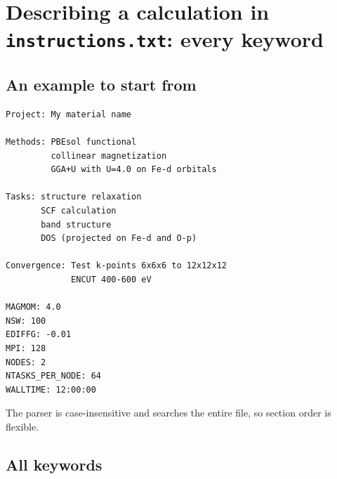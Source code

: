 \documentclass[11pt,a4paper]{scrartcl}
\begin{document}
\section{Describing a calculation in \texttt{instructions.txt}: every keyword}
\label{sec:instructions}

\subsection{An example to start from}

\begin{lstlisting}
Project: My material name

Methods: PBEsol functional
         collinear magnetization
         GGA+U with U=4.0 on Fe-d orbitals

Tasks: structure relaxation
       SCF calculation
       band structure
       DOS (projected on Fe-d and O-p)

Convergence: Test k-points 6x6x6 to 12x12x12
             ENCUT 400-600 eV

MAGMOM: 4.0
NSW: 100
EDIFFG: -0.01
MPI: 128
NODES: 2
NTASKS_PER_NODE: 64
WALLTIME: 12:00:00
\end{lstlisting}

The parser is case-insensitive and searches the entire file, so section
order is flexible.

\subsection{All keywords}
\label{sec:keywords}
\end{document}
